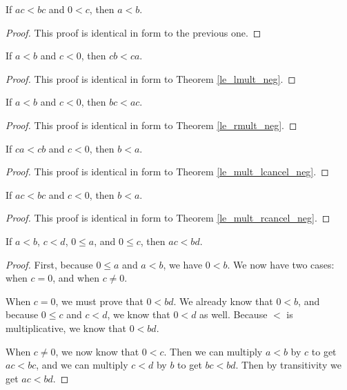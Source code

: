\documentclass[../../math.tex]{subfiles}
\begin{document}
\begin{theorem}
    If $ac < bc$ and $0 < c$, then $a < b$.
\end{theorem}
\begin{proof}
    This proof is identical in form to the previous one.
\end{proof}

\begin{theorem}
    If $a < b$ and $c < 0$, then $cb < ca$.
\end{theorem}
\begin{proof}
    This proof is identical in form to Theorem \ref{le_lmult_neg}.
\end{proof}

\begin{theorem}
    If $a < b$ and $c < 0$, then $bc < ac$.
\end{theorem}
\begin{proof}
    This proof is identical in form to Theorem \ref{le_rmult_neg}.
\end{proof}

\begin{theorem}
    If $ca < cb$ and $c < 0$, then $b < a$.
\end{theorem}
\begin{proof}
    This proof is identical in form to Theorem \ref{le_mult_lcancel_neg}.
\end{proof}

\begin{theorem}
    If $ac < bc$ and $c < 0$, then $b < a$.
\end{theorem}
\begin{proof}
    This proof is identical in form to Theorem \ref{le_mult_rcancel_neg}.
\end{proof}

\begin{theorem}
    If $a < b$, $c < d$, $0 \leq a$, and $0 \leq c$, then $ac < bd$.
\end{theorem}
\begin{proof}
    First, because $0 \leq a$ and $a < b$, we have $0 < b$.  We now have two
    cases: when $c = 0$, and when $c \neq 0$.

    When $c = 0$, we must prove that $0 < bd$.  We already know that $0 < b$,
    and because $0 \leq c$ and $c < d$, we know that $0 < d$ as well.  Because
    $<$ is multiplicative, we know that $0 < bd$.

    When $c \neq 0$, we now know that $0 < c$.  Then we can multiply $a < b$ by
    $c$ to get $ac < bc$, and we can multiply $c < d$ by $b$ to get $bc < bd$.
    Then by transitivity we get $ac < bd$.
\end{proof}
\end{document}

